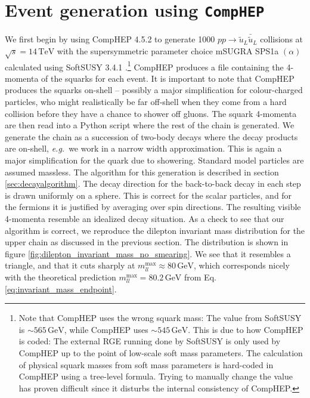 \documentclass[twoside,english]{uiofysmaster}
\begin{document}
\section{Event generation using {\tt CompHEP}}
We first begin by using {\ttfamily CompHEP 4.5.2} \cite{Pukhov:1999gg} to generate 1000 $pp \to \tilde{u}_L \bar{\tilde{u}}_L$ collisions at $\sqrt{s} = 14 \, \mathrm{TeV}$ with the supersymmetric parameter choice mSUGRA SPS1a $(\alpha)$ \cite{Allanach:2002nj} calculated using {\ttfamily SoftSUSY 3.4.1} \cite{Allanach:2001kg}.\footnote{Note that CompHEP uses the wrong squark mass: The value from SoftSUSY is $\sim 565 \,\mathrm{GeV}$, while CompHEP uses $\sim 545 \,\mathrm{GeV}$. This is due to how CompHEP is coded: The external RGE running done by SoftSUSY is only used by CompHEP up to the point of low-scale soft mass parameters. The calculation of physical squark masses from soft mass parameters is hard-coded in CompHEP using a tree-level formula. Trying to manually change the value has proven difficult since it disturbs the internal consistency of CompHEP.}  {\ttfamily CompHEP} produces a file containing the 4-momenta of the squarks for each event. It is important to note that {\ttfamily CompHEP} produces the squarks on-shell -- possibly a major simplification for colour-charged particles, who might realistically be far off-shell when they come from a hard collision before they have a chance to shower off gluons. The squark 4-momenta are then read into a Python script where the rest of the chain is generated. We generate the chain as a succession of two-body decays where the decay products are on-shell, {\it e.g.}\ we work in a narrow width approximation. This is again a major simplification for the quark due to showering. Standard model particles are assumed massless. The algorithm for this generation is described in section \ref{sec:decayalgorithm}. The decay direction for the back-to-back decay in each step is drawn uniformly on a sphere. This is correct for the scalar particles, and for the fermions it is justified by averaging over spin directions.  The resulting visible 4-momenta resemble an idealized decay situation. As a check to see that our algorithm is correct, we reproduce the dilepton invariant mass distribution for the upper chain as discussed in the previous section. The distribution is shown in figure \ref{fig:dilepton_invariant_mass_no_smearing}. We see that it resembles a triangle, and that it cuts sharply at $m_{ll}^{\mathrm{max}} \approx 80 \, \mathrm{GeV}$, which corresponds nicely with the theoretical prediction $m_{ll}^\text{max} = 80.2 \, \mathrm{GeV}$ from Eq. \ref{eq:invariant_mass_endpoint}.
\end{document}

